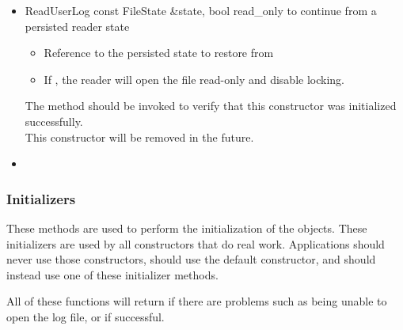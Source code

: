 \begin{itemize}
\item \Constructor
  {ReadUserLog}
  {const FileState \&state, bool read\_only}
  {to continue from a persisted reader state}
  \begin{itemize}
  \item {}
    Reference to the persisted state to restore from
  \item {}
    If , the reader will open the file read-only and
    disable locking.
  \end{itemize}
  \Note The 
  method should be invoked to verify that this constructor was
  initialized successfully.
  \\ \Note This constructor will be removed in the future.

\item {}

\end{itemize}


\subsubsection{Initializers}

These methods are used to perform the initialization of the
 objects.  These initializers are used by all constructors
that do real work.  
Applications should never use those constructors,
should use the default constructor,
 and should instead use one of these initializer methods.

All of these functions will return  if there are problems
such as being unable to open the log file,
or  if successful.

